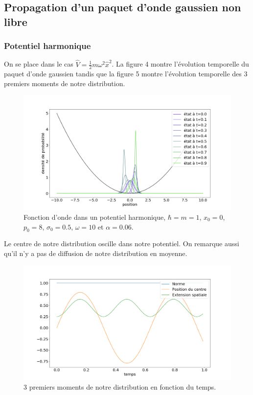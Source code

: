 \documentclass[11pt, a4paper, twocolumn]{article}
\begin{document}
\subsection{Propagation d'un paquet d'onde gaussien non libre}
\subsubsection{Potentiel harmonique}
On se place dans le cas $\hat{V} = \frac{1}{2}m\omega^2\hat{x}^2$. La figure 4 montre l'évolution temporelle du paquet d'onde gaussien tandis que la figure 5 montre l'évolution temporelle des 3 premiers moments de notre distribution.
\begin{figure}
\includegraphics[width=\linewidth]{Figure_4.png}
\caption{Fonction d'onde dans un potentiel harmonique, $\hbar = m = 1$, $x_0 = 0$, $p_0 = 8$, $\sigma_0 = 0.5$, $\omega = 10$ et $\alpha = 0.06$.}
\end{figure}
Le centre de notre distribution oscille dans notre potentiel. On remarque aussi qu'il n'y a pas de diffusion de notre distribution en moyenne.
\begin{figure}
\includegraphics[width=\linewidth]{Figure_5.png}
\caption{3 premiers moments de notre distribution en fonction du temps.}
\end{figure}
\end{document}
